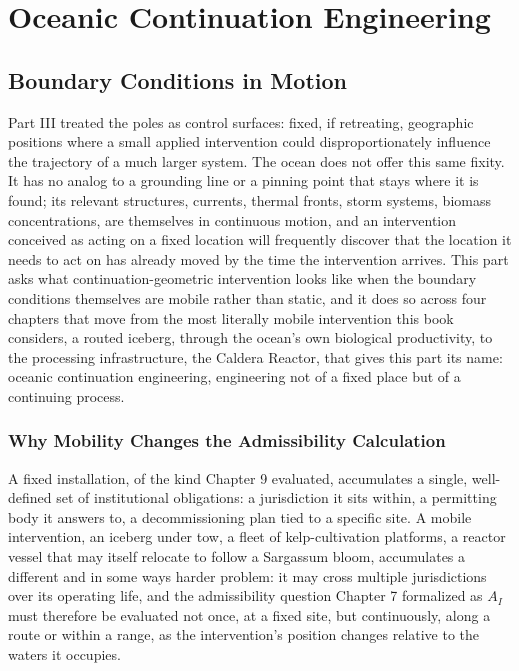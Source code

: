 \documentclass[11pt,oneside]{book}
\begin{document}
\part{Oceanic Continuation Engineering}

\chapter{Boundary Conditions in Motion}

Part III treated the poles as control surfaces: fixed, if retreating, geographic positions where a small applied intervention could disproportionately influence the trajectory of a much larger system. The ocean does not offer this same fixity. It has no analog to a grounding line or a pinning point that stays where it is found; its relevant structures, currents, thermal fronts, storm systems, biomass concentrations, are themselves in continuous motion, and an intervention conceived as acting on a fixed location will frequently discover that the location it needs to act on has already moved by the time the intervention arrives. This part asks what continuation-geometric intervention looks like when the boundary conditions themselves are mobile rather than static, and it does so across four chapters that move from the most literally mobile intervention this book considers, a routed iceberg, through the ocean's own biological productivity, to the processing infrastructure, the Caldera Reactor, that gives this part its name: oceanic continuation engineering, engineering not of a fixed place but of a continuing process.

\section*{Why Mobility Changes the Admissibility Calculation}

A fixed installation, of the kind Chapter 9 evaluated, accumulates a single, well-defined set of institutional obligations: a jurisdiction it sits within, a permitting body it answers to, a decommissioning plan tied to a specific site. A mobile intervention, an iceberg under tow, a fleet of kelp-cultivation platforms, a reactor vessel that may itself relocate to follow a Sargassum bloom, accumulates a different and in some ways harder problem: it may cross multiple jurisdictions over its operating life, and the admissibility question Chapter 7 formalized as $A_I$ must therefore be evaluated not once, at a fixed site, but continuously, along a route or within a range, as the intervention's position changes relative to the waters it occupies.
\end{document}
